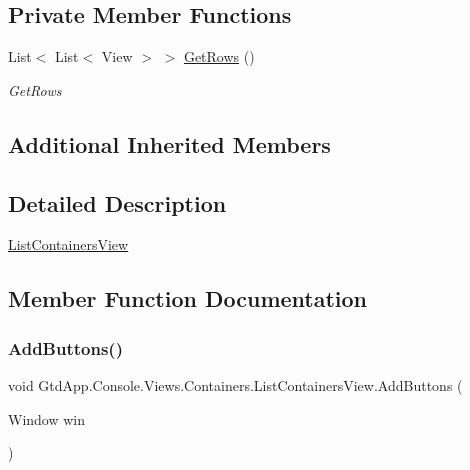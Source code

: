 \subsection*{Private Member Functions}
\begin{DoxyCompactItemize}
\item 
List$<$ List$<$ View $>$ $>$ \mbox{\hyperlink{class_gtd_app_1_1_console_1_1_views_1_1_containers_1_1_list_containers_view_a640ec350781eaff71a7ae52f4f20949c}{Get\+Rows}} ()
\begin{DoxyCompactList}\small\item\em Get\+Rows \end{DoxyCompactList}\end{DoxyCompactItemize}
\subsection*{Additional Inherited Members}


\subsection{Detailed Description}
\mbox{\hyperlink{class_gtd_app_1_1_console_1_1_views_1_1_containers_1_1_list_containers_view}{List\+Containers\+View}} 



\subsection{Member Function Documentation}
\mbox{\label{class_gtd_app_1_1_console_1_1_views_1_1_containers_1_1_list_containers_view_a5e55e9c80a1e759ea9588a0ee6150a36}} 
\subsubsection{\texorpdfstring{Add\+Buttons()}{AddButtons()}}
{\footnotesize\ttfamily void Gtd\+App.\+Console.\+Views.\+Containers.\+List\+Containers\+View.\+Add\+Buttons (\begin{DoxyParamCaption}\item[{Window}]{win }\end{DoxyParamCaption})\hspace{0.3cm}{\ttfamily [protected]}}



